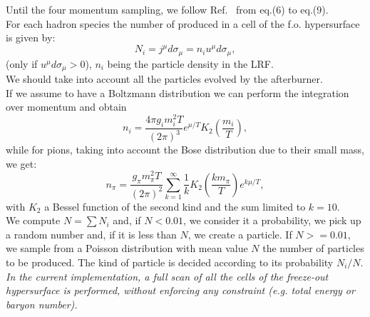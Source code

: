 \documentclass[12pt, a4paper]{report}
\begin{document}
	Until the four momentum sampling, we follow Ref.~\cite{Huovinen:2012is}
	from eq.(6) to eq.(9).\\
	
	For each hadron species the number of produced in a cell of the f.o. hypersurface is given by:
	\begin{equation}
	N_i = j^\mu d\sigma_\mu = n_i  u^\mu  d\sigma_{\mu},
	\label{num_par}
	\end{equation}
	(only if  $u^\mu d\sigma_{\mu}>0$), $n_i$ being the particle density in the LRF.\\
	We should take into account all the particles evolved by the afterburner. \\
	If we assume to have a Boltzmann distribution we can perform the integration over momentum
	and obtain
	\begin{equation}
	n_i=\frac{4\pi g_i m_i^2 T}{(2\pi)^3}e^{{\mu}/{T}}K_2\left(\frac{m_i}{T}\right),
	\end{equation}
	while for pions, taking into account the Bose distribution due to their small mass, we get:
	\begin{equation}
	n_\pi = \frac{g_\pi m_\pi^2T}{(2\pi)^2}\sum_{k=1}^\infty \frac{1}{k}K_2\left(\frac{k
		m_\pi}{T}\right)e^{{k\mu}/{T}},
	\end{equation} 
	with $K_2$ a Bessel function of the second kind and the sum limited to $k=10$.\\
	We compute $N=\sum N_i$ and, if $N< 0.01$, we consider it a probability, we pick up a random number and, if it is less than $N$, we create a particle.
	If $N>=0.01$, we sample from a Poisson distribution with mean value $N$ the number of particles to be produced.
	The kind of particle is decided according to its
	probability $N_i/N$. \\
	
    {\emph{In the current implementation, a full scan of all the cells of the freeze-out hypersurface is performed, without enforcing any constraint (e.g. total energy or baryon number).}}\\
	
\end{document}
